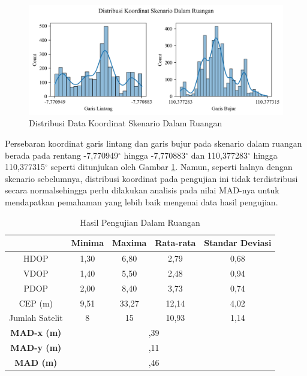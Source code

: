 \begin{figure}[H]
	\centering
	\begin{adjustbox}{width=\textwidth}
		\includegraphics{contents/chapter-4/2-skenario-indoor/distribution.png}
	\end{adjustbox}
	\caption{Distribusi Data Koordinat Skenario Dalam Ruangan}
	\label{Fig:indoor-distribution}
\end{figure}

Persebaran koordinat garis lintang dan garis bujur pada skenario dalam ruangan berada pada rentang -7,770949$^{\circ}$ hingga -7,770883$^{\circ}$ dan 110,377283$^{\circ}$ hingga 110,377315$^{\circ}$ seperti ditunjukan oleh Gambar \ref{Fig:indoor-distribution}. Namun, seperti halnya dengan skenario sebelumnya, distribusi koordinat pada pengujian ini tidak terdistribusi secara normalsehingga perlu dilakukan analisis pada nilai MAD-nya untuk mendapatkan pemahaman yang lebih baik mengenai data hasil pengujian.

\begin{table}[H]
	\caption{Hasil Pengujian Dalam Ruangan}
	\vspace{0.5em}
	\centering
	\begin{tabular}{ccccc}
		\hline
		& \textbf{Minima} & \textbf{Maxima} & \textbf{Rata-rata} & \textbf{Standar Deviasi}\\
		\hline 
		HDOP & 1,30 & 6,80 & 2,79 & 0,68\\
		VDOP & 1,40 & 5,50 & 2,48 & 0,94\\
		PDOP & 2,00 & 8,40 & 3,73 & 0,74\\
		CEP (m) & 9,51	& 33,27 & 12,14 & 4,02\\
		Jumlah Satelit & 8 & 15 & 10,93 & 1,14\\
		\hline
		\textbf{MAD-x (m)} & & \multicolumn{2}{c}{\centering 7,39} & \\
		\hline
		\textbf{MAD-y (m)} & & \multicolumn{2}{c}{\centering 4,11} & \\
		\hline
		\textbf{MAD (m)} & & \multicolumn{2}{c}{\centering 8,46} & \\
		\hline
	\end{tabular}
	\label{Tab: indoor-table}
\end{table}

